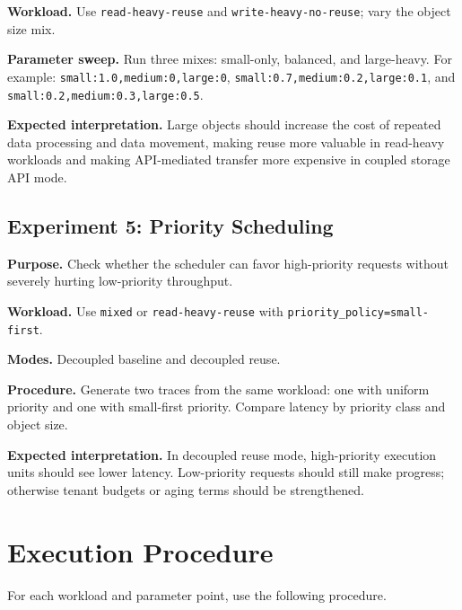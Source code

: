 \documentclass[11pt]{article}
\begin{document}
\textbf{Workload.}
Use \texttt{read-heavy-reuse} and \texttt{write-heavy-no-reuse}; vary the object
size mix.

\textbf{Parameter sweep.}
Run three mixes: small-only, balanced, and large-heavy.  For example:
\texttt{small:1.0,medium:0,large:0},
\texttt{small:0.7,medium:0.2,large:0.1}, and
\texttt{small:0.2,medium:0.3,large:0.5}.

\textbf{Expected interpretation.}
Large objects should increase the cost of repeated data processing and data
movement, making reuse more valuable in read-heavy workloads and making
API-mediated transfer more expensive in coupled storage API mode.

\subsection{Experiment 5: Priority Scheduling}

\textbf{Purpose.}
Check whether the scheduler can favor high-priority requests without severely
hurting low-priority throughput.

\textbf{Workload.}
Use \texttt{mixed} or \texttt{read-heavy-reuse} with
\texttt{priority\_policy=small-first}.

\textbf{Modes.}
Decoupled baseline and decoupled reuse.

\textbf{Procedure.}
Generate two traces from the same workload: one with uniform priority and one
with small-first priority.  Compare latency by priority class and object size.

\textbf{Expected interpretation.}
In decoupled reuse mode, high-priority execution units should see lower latency.
Low-priority requests should still make progress; otherwise tenant budgets or
aging terms should be strengthened.

\section{Execution Procedure}

For each workload and parameter point, use the following procedure.
\end{document}
